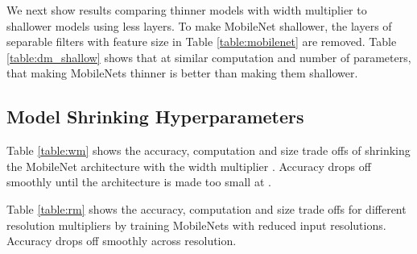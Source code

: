 \documentclass[10pt,twocolumn,letterpaper]{article}
\begin{document}
We next show results comparing thinner models with width multiplier to shallower models using less layers. To make MobileNet shallower, the  layers of separable filters with feature size  in Table \ref{table:mobilenet} are removed. Table \ref{table:dm_shallow} shows that at similar computation and number of parameters, that making MobileNets thinner is  better than making them shallower.

\begin{table}[t]
  \caption{Narrow vs Shallow MobileNet} \centering {}
\end{table}

\subsection{Model Shrinking Hyperparameters}

Table \ref{table:wm} shows the accuracy, computation and size trade offs of shrinking the MobileNet architecture with the width multiplier .
Accuracy drops off smoothly until the architecture is made too small at .

\begin{table}[t]
  \caption{MobileNet Width Multiplier} \centering {}
\end{table}

Table \ref{table:rm} shows the accuracy, computation and size trade offs for different resolution multipliers by
training MobileNets with reduced input resolutions. Accuracy drops off smoothly across resolution.
\end{document}
